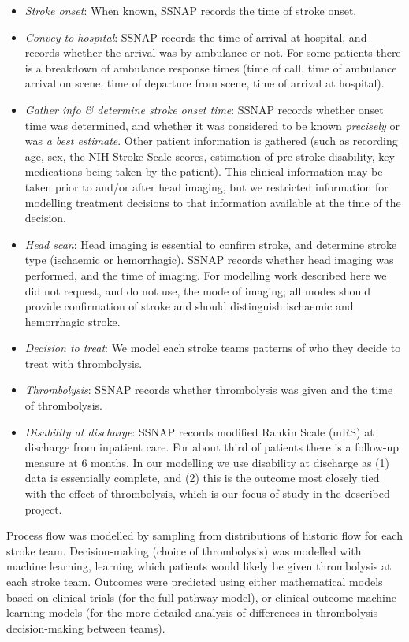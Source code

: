 \begin{itemize}

    \item \textit{Stroke onset}: When known, SSNAP records the time of stroke onset.

    \item \textit{Convey to hospital}: SSNAP records the time of arrival at hospital, and records whether the arrival was by ambulance or not. For some patients there is a breakdown of ambulance response times (time of call, time of ambulance arrival on scene, time of departure from scene, time of arrival at hospital).

    \item \textit{Gather info \& determine stroke onset time}: SSNAP records whether onset time was determined, and whether it was considered to be known \textit{precisely} or was \textit{a best estimate}. Other patient information is gathered (such as recording age, sex, the NIH Stroke Scale scores, estimation of pre-stroke disability, key medications being taken by the patient). This clinical information may be taken prior to and/or after head imaging, but we restricted information for modelling treatment decisions to that information available at the time of the decision.

    \item \textit{Head scan}: Head imaging is essential to confirm stroke, and determine stroke type (ischaemic or hemorrhagic). SSNAP records whether head imaging was performed, and the time of imaging. For modelling work described here we did not request, and do not use, the mode of imaging; all modes should provide confirmation of stroke and should distinguish ischaemic and hemorrhagic stroke. 

    \item \textit{Decision to treat}: We model each stroke teams patterns of who they decide to treat with thrombolysis.

    \item \textit{Thrombolysis}: SSNAP records whether thrombolysis was given and the time of thrombolysis.

    \item \textit{Disability at discharge}: SSNAP records modified Rankin Scale (mRS) at discharge from inpatient care. For about third of patients there is a follow-up measure at 6 months. In our modelling we use disability at discharge as (1) data is essentially complete, and (2) this is the outcome most closely tied with the effect of thrombolysis, which is our focus of study in the described project.

\end{itemize}


Process flow was modelled by sampling from distributions of historic flow for each stroke team. Decision-making (choice of thrombolysis) was modelled with machine learning, learning which patients would likely be given thrombolysis at each stroke team. Outcomes were predicted using either mathematical models based on clinical trials (for the full pathway model), or clinical outcome machine learning models (for the more detailed analysis of differences in thrombolysis decision-making between teams).
